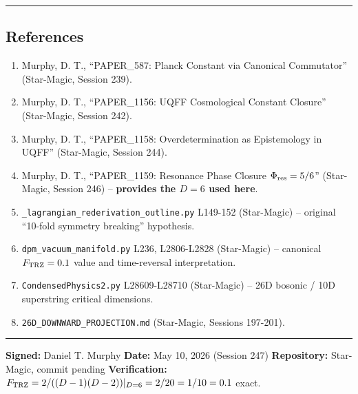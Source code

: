 \documentclass[
]{article}
\providecommand{\tightlist}{%
  \setlength{\itemsep}{0pt}\setlength{\parskip}{0pt}}
\begin{document}
\begin{center}\rule{0.5\linewidth}{0.5pt}\end{center}

\subsection{References}\label{references}

\begin{enumerate}
\def\labelenumi{\arabic{enumi}.}
\tightlist
\item
  Murphy, D. T., ``PAPER\_587: Planck Constant via Canonical
  Commutator'' (Star-Magic, Session 239).
\item
  Murphy, D. T., ``PAPER\_1156: UQFF Cosmological Constant Closure''
  (Star-Magic, Session 242).
\item
  Murphy, D. T., ``PAPER\_1158: Overdetermination as Epistemology in
  UQFF'' (Star-Magic, Session 244).
\item
  Murphy, D. T., ``PAPER\_1159: Resonance Phase Closure
  \(\Phi_{\rm res} = 5/6\)'' (Star-Magic, Session 246) --
  \textbf{provides the \(D=6\) used here}.
\item
  \texttt{\_lagrangian\_rederivation\_outline.py} L149-152 (Star-Magic)
  -- original ``10-fold symmetry breaking'' hypothesis.
\item
  \texttt{dpm\_vacuum\_manifold.py} L236, L2806-L2828 (Star-Magic) --
  canonical \(F_{\rm TRZ} = 0.1\) value and time-reversal
  interpretation.
\item
  \texttt{CondensedPhysics2.py} L28609-L28710 (Star-Magic) -- 26D
  bosonic / 10D superstring critical dimensions.
\item
  \texttt{26D\_DOWNWARD\_PROJECTION.md} (Star-Magic, Sessions 197-201).
\end{enumerate}

\begin{center}\rule{0.5\linewidth}{0.5pt}\end{center}

\textbf{Signed:} Daniel T. Murphy \textbf{Date:} May 10, 2026 (Session
247) \textbf{Repository:} Star-Magic, commit pending
\textbf{Verification:}
\(F_{\rm TRZ} = 2/((D-1)(D-2))|_{D=6} = 2/20 = 1/10 = 0.1\) exact.
\end{document}
